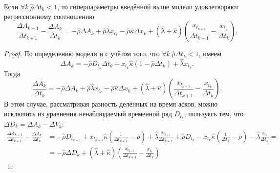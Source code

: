 \begin{appendices}
	\begin{theorem}
		Если $\forall k \ \hat \rho \Delta t_k < 1$, то гиперпараметры введённой выше
		модели удовлетворяют регрессионному соотношению
		\begin{equation} \label{GenIntT}
			\frac{\Delta A_{k+1}}{\Delta t_{k+1}} - \frac{\Delta A_{k}}{\Delta t_{k}} =
			-\hat \rho \Delta A_k + \hat \rho \hat \lambda x_{t_k} - \hat \rho \hat \kappa \Delta x_k
			+ (\hat \lambda + \hat \kappa) \left(\frac{x_{t_{k+1}}}{\Delta t_{k+1}} - \frac{x_{t_k}}{\Delta t_{k}}\right).
		\end{equation}
	\end{theorem}
	\begin{proof}
		По определению модели и с учётом того, что $\forall k \ \hat \rho \Delta t_k < 1$, имеем
		\begin{equation*}
			\Delta A_k = - \hat \rho D_{t_k} \Delta t_k + x_{t_k} \hat \kappa (1 - \hat \rho \Delta t_k) + \hat \lambda x_{t_k} .
		\end{equation*}
		Тогда
		\begin{equation*}
			\frac{\Delta A_k}{\Delta t_k} = -\hat \rho \Delta A_k + \hat \rho \hat \lambda x_{t_k} - \hat \rho \hat \kappa \Delta x_k
			+ (\hat \lambda + \hat \kappa) \left(\frac{x_{t_{k+1}}}{\Delta t_{k+1}} - \frac{x_{t_k}}{\Delta t_{k}}\right).
		\end{equation*}
		В этом случае,
		рассматривая разность делённых на время асков, можно
		исключить из уравнения ненаблюдаемый временной ряд $D_{t_k}$, пользуясь тем, что $\Delta D_k = \Delta A_k -  \Delta V_k$:
		\begin{align*}
			\frac{\Delta A_{k+1}}{\Delta t_{k+1}} - \frac{\Delta A_{k}}{\Delta t_{k}} & =
			- \hat \rho D_{t_{k+1}} + x_{t_{k+1}} \hat \kappa \left(\frac{1}{\Delta t_{k+1}} - \rho \right) + \hat \lambda \frac{x_{t_{k+1}}}{\Delta t_{k+1}}
			+ \hat \rho D_{t_{k}}   - x_{t_{k}}   \hat \kappa \left(\frac{1}{\Delta t_{k}} - \rho \right)   - \hat \lambda \frac{x_{t_k}}    {\Delta t_{k}}
			=                                                                                                                                                                                                                 \\
			                                                                          & = -\hat \rho \Delta D_k + (\hat \lambda + \hat \kappa) \left(\frac{x_{t_{k+1}}}{\Delta t_{k+1}} - \frac{x_{t_k}}{\Delta t_{k}}\right)

\end{align*}
\end{proof}
\end{appendices}
